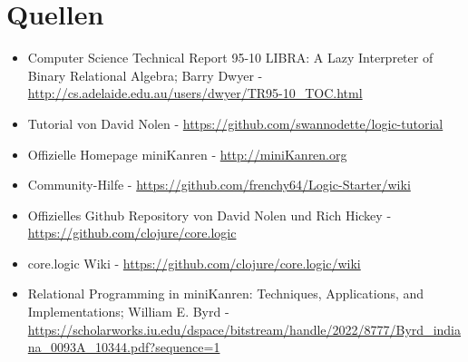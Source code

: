 \section{Quellen}

\begin{itemize}
\item Computer Science Technical Report 95-10 LIBRA: A Lazy Interpreter of Binary Relational Algebra; Barry Dwyer - \url{http://cs.adelaide.edu.au/users/dwyer/TR95-10_TOC.html}

\item Tutorial von David Nolen - \url{https://github.com/swannodette/logic-tutorial}

\item Offizielle Homepage miniKanren - \url{http://miniKanren.org}

\item Community-Hilfe - \url{https://github.com/frenchy64/Logic-Starter/wiki}

\item Offizielles Github Repository von David Nolen und Rich Hickey - \url{https://github.com/clojure/core.logic}

\item core.logic Wiki - \url{https://github.com/clojure/core.logic/wiki}

\item Relational Programming in miniKanren: Techniques, Applications, and Implementations; William E. Byrd - \url{https://scholarworks.iu.edu/dspace/bitstream/handle/2022/8777/Byrd_indiana_0093A_10344.pdf?sequence=1}
\end{itemize}
